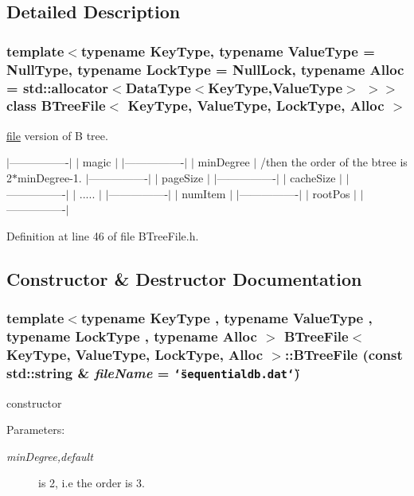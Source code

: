 \subsection{Detailed Description}
\subsubsection*{template$<$typename KeyType, typename ValueType = NullType, typename LockType = NullLock, typename Alloc = std::allocator$<$DataType$<$KeyType,ValueType$>$ $>$$>$ class BTreeFile$<$ KeyType, ValueType, LockType, Alloc $>$}

\hyperlink{classfile}{file} version of B tree. 

$|$----------------$|$ $|$ magic $|$ $|$----------------$|$ $|$ minDegree $|$ /then the order of the btree is 2$\ast$minDegree-1. $|$----------------$|$ $|$ pageSize $|$ $|$----------------$|$ $|$ cacheSize $|$ $|$----------------$|$ $|$ ..... $|$ $|$----------------$|$ $|$ numItem $|$ $|$----------------$|$ $|$ rootPos $|$ $|$----------------$|$ 

Definition at line 46 of file BTreeFile.h.

\subsection{Constructor \& Destructor Documentation}
\hypertarget{classBTreeFile_5609875a43e3c7e70229ac4215aafaff}{
\subsubsection[{BTreeFile}]{\setlength{\rightskip}{0pt plus 5cm}template$<$typename KeyType , typename ValueType , typename LockType , typename Alloc $>$ {\bf BTreeFile}$<$ KeyType, ValueType, LockType, Alloc $>$::{\bf BTreeFile} (const std::string \& {\em fileName} = {\tt \char`\"{}sequentialdb.dat\char`\"{}})}}
\label{classBTreeFile_5609875a43e3c7e70229ac4215aafaff}


constructor 

\begin{Desc}
\item[Parameters:]
\begin{description}
\item[{\em minDegree,default}]is 2, i.e the order is 3. \end{description}
\end{Desc}


